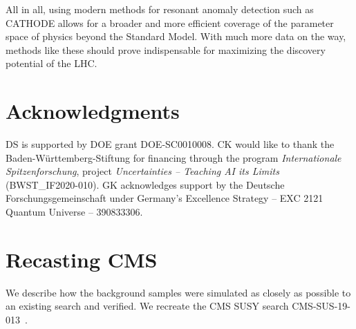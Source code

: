 \documentclass[prd, twocolumn, superscriptaddress,floatfix, nofootinbib, preprintnumbers]{revtex4-2}
\begin{document}
All in all, using modern methods for resonant anomaly detection such as CATHODE allows for a broader and more efficient coverage of the parameter space of physics beyond the Standard Model. With much more data on the way, methods like these should prove indispensable for maximizing the discovery potential of the LHC. 


\section{Acknowledgments}

DS is supported by DOE grant DOE-SC0010008. CK would like to thank the Baden-W\"urttemberg-Stiftung for financing through the program \textsl{Internationale Spitzenforschung}, pro\-ject \textsl{Uncertainties – Teaching AI its Limits} (BWST\_IF2020-010).
GK acknowledges support by the Deutsche Forschungsgemeinschaft under Germany’s Excellence Strategy – EXC 2121  Quantum Universe – 390833306.


\appendix

\section{Recasting CMS}
\label{sec:recasting_cms}

We describe how the background samples were simulated as closely as possible to an existing search and verified. We recreate the CMS SUSY search CMS-SUS-19-013~\cite{CMS:2020fia}.
\end{document}
